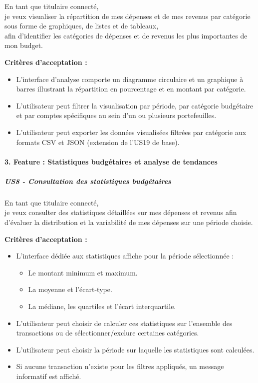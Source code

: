 En tant que titulaire connecté,\\
je veux visualiser la répartition de mes dépenses et de mes revenus par
catégorie sous forme de graphiques, de listes et de tableaux,\\
afin d'identifier les catégories de dépenses et de revenus les plus
importantes de mon budget.

\textbf{Critères d'acceptation :}

\begin{itemize}
\tightlist
\item
  L'interface d'analyse comporte un diagramme circulaire et un graphique
  à barres illustrant la répartition en pourcentage et en montant par
  catégorie.
\item
  L'utilisateur peut filtrer la visualisation par période, par catégorie
  budgétaire et par comptes spécifiques au sein d'un ou plusieurs
  portefeuilles.
\item
  L'utilisateur peut exporter les données visualisées filtrées par
  catégorie aux formats CSV et JSON (extension de l'US19 de base).
\end{itemize}

\hypertarget{feature-statistiques-budguxe9taires-et-analyse-de-tendances}{%
\paragraph{3. Feature : Statistiques budgétaires et analyse de
tendances}\label{feature-statistiques-budguxe9taires-et-analyse-de-tendances}}

\hypertarget{us8---consultation-des-statistiques-budguxe9taires}{%
\subparagraph{US8 - Consultation des statistiques
budgétaires}\label{us8---consultation-des-statistiques-budguxe9taires}}

En tant que titulaire connecté,\\
je veux consulter des statistiques détaillées sur mes dépenses et
revenus afin d'évaluer la distribution et la variabilité de mes dépenses
sur une période choisie.

\textbf{Critères d'acceptation :}

\begin{itemize}
\tightlist
\item
  L'interface dédiée aux statistiques affiche pour la période
  sélectionnée :

  \begin{itemize}
  \tightlist
  \item
    Le montant minimum et maximum.
  \item
    La moyenne et l'écart-type.
  \item
    La médiane, les quartiles et l'écart interquartile.
  \end{itemize}
\item
  L'utilisateur peut choisir de calculer ces statistiques sur l'ensemble
  des transactions ou de sélectionner/exclure certaines catégories.
\item
  L'utilisateur peut choisir la période sur laquelle les statistiques
  sont calculées.
\item
  Si aucune transaction n'existe pour les filtres appliqués, un message
  informatif est affiché.
\end{itemize}

